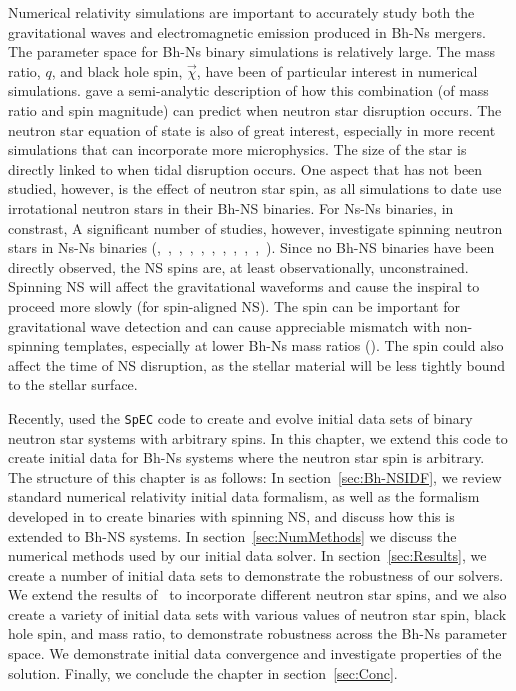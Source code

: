 Numerical relativity simulations are important to accurately study
both the gravitational waves and electromagnetic emission produced in
Bh-Ns mergers. The parameter space for Bh-Ns binary simulations is
relatively large. The mass ratio, $q$, and black hole spin, $\vec{\chi}$, have been of particular interest in numerical simulations. 
\cite{Foucart2012} gave a semi-analytic description of how this
combination (of mass ratio and spin magnitude) can predict when
neutron star disruption occurs. The neutron star equation of state is also of
great interest, especially in more recent simulations that can
incorporate more microphysics.  The size of the star is directly
linked to when tidal disruption occurs. One aspect that has not been
studied, however, is the effect of neutron star spin, as all
simulations to date use irrotational neutron stars in their Bh-NS
binaries. For Ns-Ns binaries, in constrast, A significant number of studies, however, investigate spinning neutron stars in Ns-Ns binaries (\cite{Baumgarte:2009fw},~\cite{Tichy:2011gw},~\cite{East:2012zn},~\cite{Tichy:2012rp},~\cite{Bernuzzi:2013rza},~\cite{Kastaun:2013mv},~\cite{Tsatsin:2013jca},~\cite{Dietrich:2015pxa},~\cite{East:2015yea},~\cite{Tsokaros:2015fea},~\cite{Tacik:2015tja}). Since no Bh-NS binaries have been directly observed, the NS spins are, at least observationally, unconstrained. Spinning NS will affect the gravitational waveforms and cause the inspiral to proceed more slowly (for spin-aligned NS). The spin can be important for gravitational wave detection and can cause appreciable mismatch with non-spinning templates, especially at lower Bh-Ns mass ratios (\cite{Ajith:2011ec}). The spin could also affect the time of NS disruption, as the stellar material will be less tightly bound to the stellar surface.

Recently, \cite{Tacik:2015tja} used the {\tt SpEC} code to create and
evolve initial data sets of binary neutron star systems with arbitrary
spins. In this chapter, we extend this code to create initial data for
Bh-Ns systems where the neutron star spin is arbitrary. The structure of this
chapter is as follows: In section~\ref{sec:Bh-NSIDF}, we review standard numerical relativity initial data formalism, as well as the formalism
developed in \cite{Tichy:2011gw} to create binaries with spinning NS,
and discuss how this is extended to Bh-NS systems. In section~\ref{sec:NumMethods} we discuss the numerical methods used by our initial data solver.
In section~\ref{sec:Results}, we create a number of initial data sets to demonstrate the robustness of our solvers. We extend the results of~\cite{Foucart:2013a} to incorporate different neutron star spins,
and we also create a variety of initial data sets with various values of neutron star spin, black hole spin, and mass ratio, to demonstrate robustness across the Bh-Ns parameter space. We demonstrate initial data convergence and investigate properties of the solution. Finally, we conclude the chapter in section~\ref{sec:Conc}.

